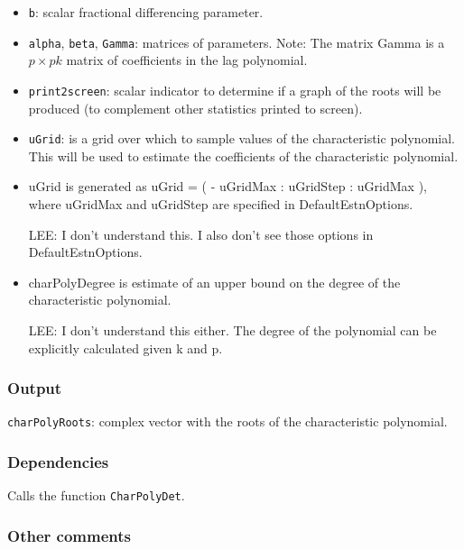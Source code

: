 \documentclass[12pt]{article}
\begin{document}
\begin{itemize}
\item \texttt{b}: scalar fractional differencing parameter. 

\item  \texttt{alpha}, \texttt{beta}, \texttt{Gamma}: matrices of parameters. Note: The matrix Gamma is a $p \times pk$ matrix of coefficients in the lag polynomial.

\item \texttt{print2screen}: scalar indicator to determine if a graph of the roots will be produced (to complement other statistics printed to screen).

\item \texttt{uGrid}: is a grid over which to sample values of the characteristic
           polynomial. This will be used to estimate the coefficients of
           the characteristic polynomial. 
     \item        uGrid is generated as uGrid = ( - uGridMax : uGridStep : uGridMax ),
           where uGridMax and uGridStep are specified in DefaultEstnOptions. 

LEE: I don't understand this. I also don't see those options in DefaultEstnOptions.

     \item        charPolyDegree is estimate of an upper bound on the degree of the 
           characteristic polynomial. 

LEE: I don't understand this either. The degree of the polynomial can be explicitly calculated given k and p.
 \end{itemize}


\subsubsection*{Output}

\texttt{charPolyRoots}: complex vector with the roots of the characteristic polynomial. 


\subsubsection*{Dependencies}

Calls the function \texttt{CharPolyDet}.


\subsubsection*{Other comments}
\end{document}

